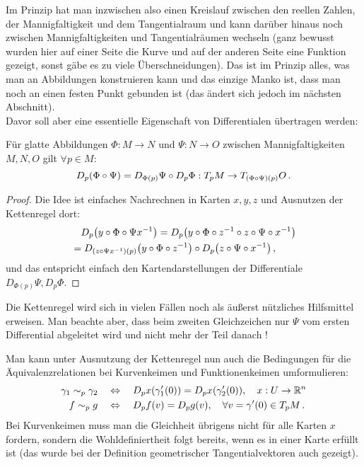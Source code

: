 \documentclass[../H_Analysis_main.tex]{subfiles}
\begin{document}
Im Prinzip hat man inzwischen also einen Kreislauf zwischen den reellen Zahlen, der Mannigfaltigkeit und dem Tangentialraum und kann darüber hinaus noch zwischen Mannigfaltigkeiten und Tangentialräumen wechseln (ganz bewusst wurden hier auf einer Seite die Kurve und auf der anderen Seite eine Funktion gezeigt, sonst gäbe es zu viele Überschneidungen). Das ist im Prinzip alles, was man an Abbildungen konstruieren kann und das einzige Manko ist, dass man noch an einen festen Punkt gebunden ist (das ändert sich jedoch im nächsten Abschnitt).\\


Davor soll aber eine essentielle Eigenschaft von Differentialen übertragen werden:
\begin{satz}[Kettenregel]
Für glatte Abbildungen $\Phi: M \rightarrow N$ und $\Psi: N \rightarrow O$ zwischen Mannigfaltigkeiten $M, N, O$ gilt $\forall p \in M$:
\begin{equation}
D_p \qty(\Phi \circ \Psi) = D_{\Phi(p)} \Psi \circ D_p \Phi: T_p M \rightarrow T_{\qty(\Phi \circ \Psi)(p)} O \, .
\end{equation}
\end{satz}
\begin{proof}
Die Idee ist einfaches Nachrechnen in Karten $x, y, z$ und Ausnutzen der Kettenregel dort:
\begin{align*}
&\quad D_p \qty(y \circ \Phi \circ \Psi x^{-1}) = D_p \qty(y \circ \Phi \circ z^{-1} \circ z \circ \Psi \circ x^{-1})
\\
&= D_{\qty(z \circ \Psi x^{-1})(p)} \qty(y \circ \Phi \circ z^{-1}) \circ D_p \qty(z \circ \Psi \circ x^{-1}) \, ,
\end{align*}
und das entspricht einfach den Kartendarstellungen der Differentiale $D_{\Phi(p)} \Psi, D_p \Phi$.
\end{proof}
Die Kettenregel wird sich in vielen Fällen noch als äußerst nützliches Hilfsmittel erweisen. Man beachte aber, dass beim zweiten Gleichzeichen nur $\Psi$ vom ersten Differential abgeleitet wird und nicht mehr der Teil danach !

\begin{bsp}
Man kann unter Ausnutzung der Kettenregel nun auch die Bedingungen für die Äquivalenzrelationen bei Kurvenkeimen und Funktionenkeimen umformulieren:
\begin{align}
\gamma_1 \sim_p \gamma_2 \quad &\Leftrightarrow \quad D_p x\qty(\gamma_1'(0)) = D_p x\qty(\gamma_2'(0)), \quad x: U \rightarrow \mathbb{R}^n
\\
f \sim_p g \quad &\Leftrightarrow \quad D_p f(v) = D_p g(v), \quad \forall v = \gamma'(0) \in T_p M \, .
\end{align}
Bei Kurvenkeimen muss man die Gleichheit übrigens nicht für alle Karten $x$ fordern, sondern die Wohldefiniertheit folgt bereits, wenn es in einer Karte erfüllt ist (das wurde bei der Definition geometrischer Tangentialvektoren auch gezeigt).
\end{bsp}
\end{document}
